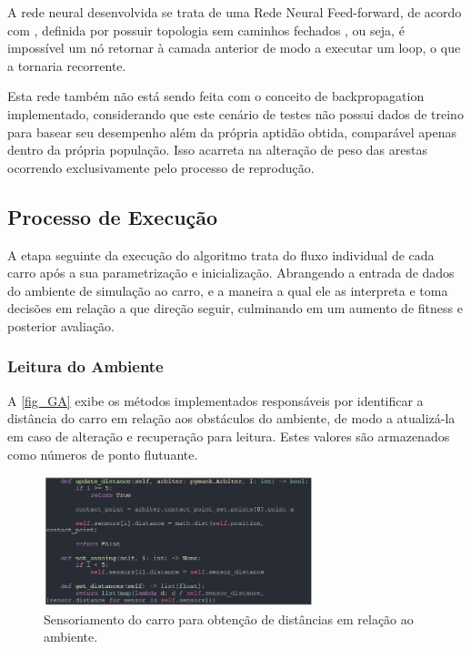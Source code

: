 A rede neural desenvolvida se trata de uma Rede Neural Feed-forward, de acordo com , definida por possuir topologia sem caminhos fechados , ou seja, é impossível um nó retornar à camada anterior de modo a executar um loop, o que a tornaria recorrente. 

Esta rede também não está sendo feita com o conceito de backpropagation implementado, considerando que este cenário de testes não possui dados de treino para basear seu desempenho além da própria aptidão obtida, comparável apenas dentro da própria população. Isso acarreta na alteração de peso das arestas ocorrendo exclusivamente pelo processo de reprodução.

\subsection{Processo de Execução}
A etapa seguinte da execução do algoritmo trata do fluxo individual de cada carro após a sua parametrização e inicialização. Abrangendo a entrada de dados do ambiente de simulação ao carro, e a maneira a qual ele as interpreta e toma decisões em relação a que direção seguir, culminando em um aumento de fitness e posterior avaliação.

\subsubsection{Leitura do Ambiente}
A \autoref{fig_GA} exibe os métodos implementados responsáveis por identificar a distância do carro em relação aos obstáculos do ambiente, de modo a atualizá-la em caso de alteração e recuperação para leitura. Estes valores são armazenados como números de ponto flutuante.

\begin{figure}[htb]
        \centering
        \caption{\label{fig_GA}Sensoriamento do carro para obtenção de distâncias em relação ao ambiente.}
        \includegraphics[width=0.7\textwidth]{images/GA.png}
\end{figure}


